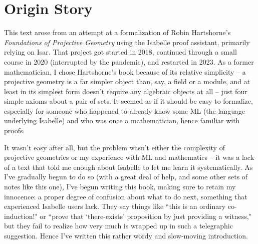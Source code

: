 \chapter*{Origin Story}
This text arose from an attempt at a formalization of Robin Hartshorne's \emph{Foundations of Projective Geometry}
using the Isabelle proof assistant, primarily relying on Isar. That project got started in 2018, continued through a small course in 2020 (interrupted by the pandemic), and restarted in 2023. As a former mathematician, I chose Hartshorne's book because of its relative simplicity -- a projective geometry is a far simpler object than, say, a field or a module, and at least in its simplest form doesn't require any algebraic objects at all -- just four simple axioms about a pair of sets. It seemed as if it should be easy to formalize, especially for someone who happened to already know some ML (the language underlying Isabelle) and who was once a mathematician, hence familiar with proofs. 

It wasn't easy after all, but the problem wasn't either the complexity of projective geometries or my experience with ML and mathematics -- it was a lack of a text that told me enough about Isabelle to let me learn it systematically. As I've gradually begun to do so (with a great deal of help, and some other sets of notes like this one), I've begun writing this book, making sure to retain my innocence: a proper degree of confusion about what to do next, something that experienced Isabelle users lack. They say things like ``this is an ordinary co-induction!" or ``prove that `there-exists' proposition by just providing a witness," but they fail to realize how very much is wrapped up in such a telegraphic suggestion. Hence I've written this rather wordy and slow-moving introduction. 
